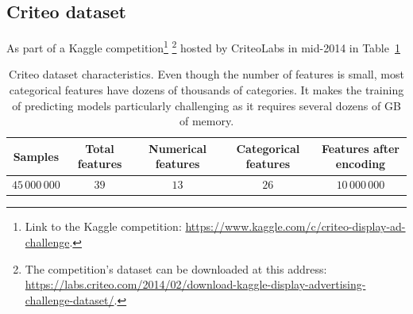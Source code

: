 \subsection{Criteo dataset}\label{subsec:snb_criteo}

As part of a Kaggle competition\footnote{
        Link to the Kaggle competition: \url{https://www.kaggle.com/c/criteo-display-ad-challenge}.
}
\footnote{
        The competition's dataset can be downloaded at this address:
        \url{https://labs.criteo.com/2014/02/download-kaggle-display-advertising-challenge-dataset/}.
}
hosted by CriteoLabs in mid-2014
in Table~\ref{tab:criteo_dataset}
\begin{table}[]
        \centering
        \setlength{\tabcolsep}{2pt}
        {\small
        \begin{tabular}{|c|c|c|c|c|}\hline
        \textbf{Samples} & \textbf{Total features} & \textbf{Numerical features} & \textbf{Categorical features} & \textbf{Features after encoding}\\ \hline
        $45\,000\,000$ & $39$  & $13$ & $26$ & $10\,000\,000$ \\ \hline
        \end{tabular}
        }%
        \caption[short]{
                Criteo dataset characteristics.
                Even though the number of features is small,
                most categorical features have dozens of thousands of categories.
                It makes the training of predicting models particularly challenging as it requires several
                dozens of GB of memory.
        }
        \label{tab:criteo_dataset}
\end{table}